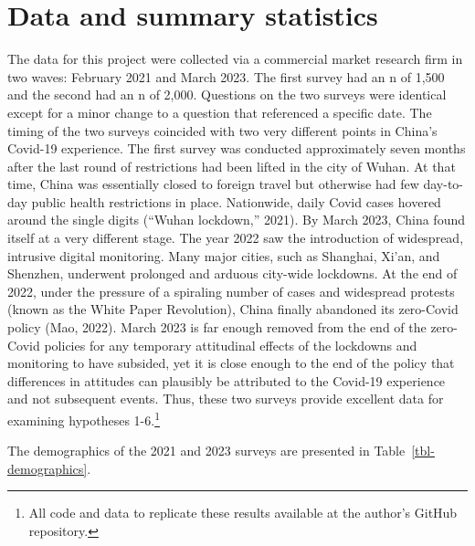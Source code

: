 \documentclass[
  letterpaper,
  DIV=11,
  numbers=noendperiod]{scrartcl}
\begin{document}
\section{Data and summary statistics}\label{sec-datasummary}

The data for this project were collected via a commercial market
research firm in two waves: February 2021 and March 2023. The first
survey had an n of 1,500 and the second had an n of 2,000. Questions on
the two surveys were identical except for a minor change to a question
that referenced a specific date. The timing of the two surveys coincided
with two very different points in China's Covid-19 experience. The first
survey was conducted approximately seven months after the last round of
restrictions had been lifted in the city of Wuhan. At that time, China
was essentially closed to foreign travel but otherwise had few
day-to-day public health restrictions in place. Nationwide, daily Covid
cases hovered around the single digits ({``Wuhan lockdown,''} 2021). By
March 2023, China found itself at a very different stage. The year 2022
saw the introduction of widespread, intrusive digital monitoring. Many
major cities, such as Shanghai, Xi'an, and Shenzhen, underwent prolonged
and arduous city-wide lockdowns. At the end of 2022, under the pressure
of a spiraling number of cases and widespread protests (known as the
White Paper Revolution), China finally abandoned its zero-Covid policy
(Mao, 2022). March 2023 is far enough removed from the end of the
zero-Covid policies for any temporary attitudinal effects of the
lockdowns and monitoring to have subsided, yet it is close enough to the
end of the policy that differences in attitudes can plausibly be
attributed to the Covid-19 experience and not subsequent events. Thus,
these two surveys provide excellent data for examining hypotheses
1-6.\footnote{All code and data to replicate these results available at
  the author's GitHub repository.}

The demographics of the 2021 and 2023 surveys are presented in
Table~\ref{tbl-demographics}.
\end{document}
